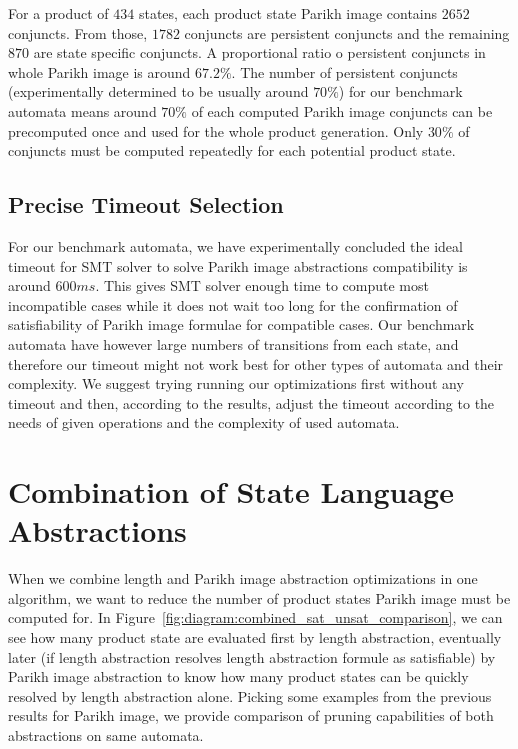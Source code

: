 For a product of $434$ states, each product state Parikh image contains $2652$ conjuncts. From those, $1782$ conjuncts are persistent conjuncts and the remaining $870$ are state specific conjuncts. A proportional ratio o persistent conjuncts in whole Parikh image is around $67.2 \%$. The number of persistent conjuncts (experimentally determined to be usually around $70 \%$) for our benchmark automata means around $70\%$ of each computed Parikh image conjuncts can be precomputed once and used for the whole product generation. Only $30\%$ of conjuncts must be computed repeatedly for each potential product state.

\subsection{Precise Timeout Selection}

For our benchmark automata, we have experimentally concluded the ideal timeout for SMT solver to solve Parikh image abstractions compatibility is around $600 ms$. This gives SMT solver enough time to compute most incompatible cases while it does not wait too long for the confirmation of satisfiability of Parikh image formulae for compatible cases. Our benchmark automata have however large numbers of transitions from each state, and therefore our timeout might not work best for other types of automata and their complexity. We suggest trying running our optimizations first without any timeout and then, according to the results, adjust the timeout according to the needs of given operations and the complexity of used automata.

\section{Combination of State Language Abstractions}

When we combine length and Parikh image abstraction optimizations in one algorithm, we want to reduce the number of product states Parikh image must be computed for. In Figure~\ref{fig:diagram:combined_sat_unsat_comparison}, we can see how many product state are evaluated first by length abstraction, eventually later (if length abstraction resolves length abstraction formule as satisfiable) by Parikh image abstraction to know how many product states can be quickly resolved by length abstraction alone. Picking some examples from the previous results for Parikh image, we provide comparison of pruning capabilities of both abstractions on same automata.

